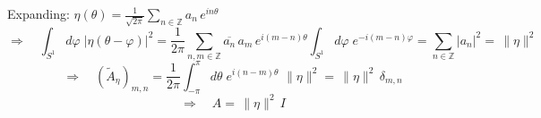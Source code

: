 \documentclass[11pt]{article}
\newcommand{\Z}{\mathbb{Z}}
\newcommand{\conj}[1]{\overline{#1}}
\begin{document}
Expanding: $\eta(\theta)=\frac{1}{\sqrt{2\pi}}\sum_{n\in\Z}a_n\,e^{in\theta}$
\[
  \Rightarrow\quad\int_{S^1}d\varphi\;|\eta(\theta-\varphi)|^2
  =\frac{1}{2\pi}\sum_{n,m\in\Z}\conj{a_n}\,a_m\,e^{i(m-n)\theta}\int_{S^1}d\varphi\;
  e^{-i(m-n)\varphi}
  =\sum_{n\in\Z}|a_n|^2=\,\|\eta\|^2
\]
\[
  \Rightarrow\quad (\tilde{A}_{\eta})_{m,n}=\frac{1}{2\pi}\int_{-\pi}^{\pi}d\theta\;
  e^{i(n-m)\theta}\,\,\|\eta\|^2=\,\|\eta\|^2\,\delta_{m,n}
\]
\[
  \Rightarrow\quad A=\,\|\eta\|^2\,I
\]









\end{document}
